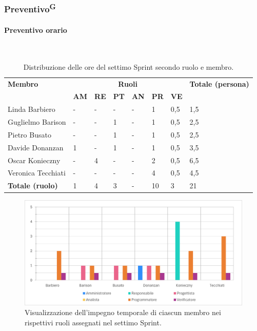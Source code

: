 \documentclass[8pt]{article}
\newcommand{\glossterm}[1]{#1\textsuperscript{G}} %
\newcommand{\subsubsubsection}[1]{\paragraph{#1}\mbox{}\\}
\begin{document}
\subsubsection{\glossterm{Preventivo}}
\subsubsubsection{Preventivo orario}
\begin{table}[ht!]
	\centering
	\begin{tabular}{p{4cm} p{1cm} p{1cm} p{1cm} p{1cm} p{1cm} p{1cm} p{3cm}}
		\toprule
        \textbf{Membro} & \multicolumn{6}{c}{\textbf{Ruoli}} & \textbf{Totale (persona)}\\
		& \textbf{AM} & \textbf{RE} & \textbf{PT} & \textbf{AN} & \textbf{PR} & \textbf{VE}\\
		\midrule
        Linda Barbiero          & -     & -     & -     & -     & 1     & 0,5     & 1,5 \\
        Guglielmo Barison       & -     & -     & 1     & -     & 1     & 0,5     & 2,5 \\
        Pietro Busato           & -     & -     & 1     & -     & 1     & 0,5     & 2,5 \\
        Davide Donanzan         & 1     & -     & 1     & -     & 1     & 0,5     & 3,5 \\
        Oscar Konieczny         & -     & 4     & -     & -     & 2     & 0,5     & 6,5 \\
        Veronica Tecchiati      & -     & -     & -     & -     & 4     & 0,5     & 4,5 \\
        \bottomrule
        \textbf{Totale (ruolo)} & 1     & 4     & 3    & -    & 10    & 3    & 21 \\
	\end{tabular}
	\caption{Distribuzione delle ore del settimo Sprint secondo ruolo e membro.}
	\label{table:Distribuzione delle ore del settimo Sprint secondo ruolo e membro}
\end{table}
\begin{figure}[ht!]
    \centering
    \includegraphics[width=15cm]{./images_pdp/istogramma_periodo_7.png}
    \caption{Visualizzazione dell'impegno temporale di ciascun membro nei rispettivi ruoli assegnati
    nel settimo Sprint.}
    \label{figure:Visualizzazione dell'impegno temporale di ciascun membro nei rispettivi ruoli
    assegnati nel settimo Sprint}
\end{figure}
\end{document}
